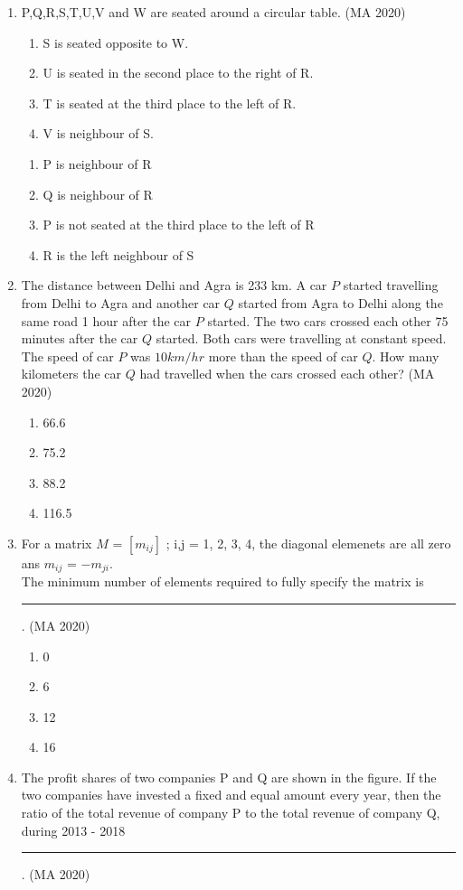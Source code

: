 \documentclass[journal,12pt,onecolumn]{IEEEtran}
\theoremstyle{remark}
\begin{document}
\begin{enumerate}
\item P,Q,R,S,T,U,V and W are seated around a circular table.
\hfill{(MA 2020)}
\begin{enumerate}
\item S is seated opposite to W.
\item U is seated in the second place to the right of R.
\item T is seated at the third place to the left of R.
\item V is neighbour of S.
\end{enumerate}

\begin{enumerate}
\item P is neighbour of R
\item Q is neighbour of R
\item P is not seated at the third place to the left of R
\item R is the left neighbour of S 
\end{enumerate}

\item The distance between Delhi and Agra is 233 km. A car $P$ started travelling from Delhi to Agra and another car $Q$ started from Agra to Delhi along the same road 1 hour after the car $P$ started. The two cars crossed each other 75 minutes after the car $Q$ started. Both cars were travelling at constant speed. The speed of car $P$ was $10 km/hr$ more than the speed of car $Q$. How many kilometers the car $Q$ had travelled when the cars crossed each other? 
\hfill{(MA 2020)}
\begin{enumerate}
\item 66.6
\item 75.2
\item 88.2
\item 116.5
\end{enumerate}
\item For a matrix $M$ = $[m_{ij}]$ ; i,j = 1, 2, 3, 4, the diagonal elemenets are all zero ans $m_{ij}$ = $-m_{ji}$.\\The minimum number of elements required to fully specify the matrix is \rule{2cm}{0.4pt}.
\hfill{(MA 2020)}
\begin{enumerate}
\item 0
\item 6
\item 12
\item 16
\end{enumerate}

\item The profit shares of two companies P and Q are shown in the figure. If the two companies have invested a fixed and equal amount every year, then the ratio of the total revenue of company P to the total revenue of company Q, during 2013 - 2018 \rule{2cm}{0.4pt}.
\hfill{(MA 2020)}


\end{enumerate}
\end{document}
